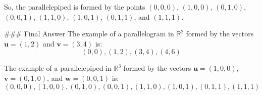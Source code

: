 So, the parallelepiped is formed by the points \((0,0,0)\), \((1,0,0)\), \((0,1,0)\), \((0,0,1)\), \((1,1,0)\), \((1,0,1)\), \((0,1,1)\), and \((1,1,1)\).

### Final Answer
The example of a parallelogram in \(\mathbb{R}^2\) formed by the vectors \(\mathbf{u} = (1, 2)\) and \(\mathbf{v} = (3, 4)\) is:
\[
\boxed{(0,0), (1,2), (3,4), (4,6)}
\]

The example of a parallelepiped in \(\mathbb{R}^3\) formed by the vectors \(\mathbf{u} = (1, 0, 0)\), \(\mathbf{v} = (0, 1, 0)\), and \(\mathbf{w} = (0, 0, 1)\) is:
\[
\boxed{(0,0,0), (1,0,0), (0,1,0), (0,0,1), (1,1,0), (1,0,1), (0,1,1), (1,1,1)}
\]